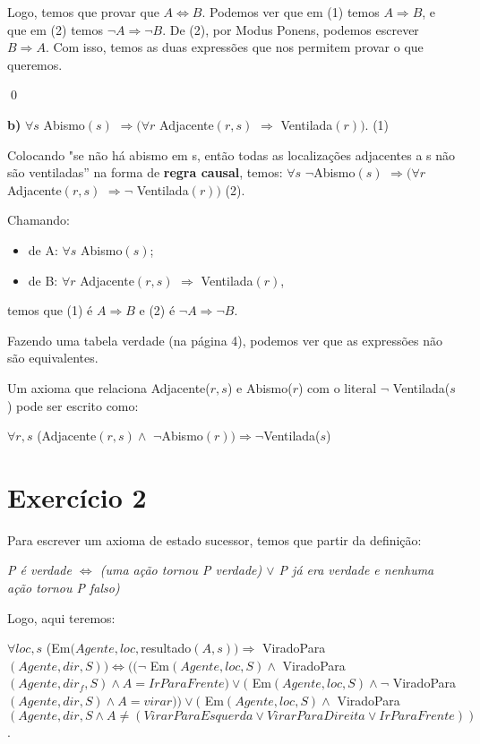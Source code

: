 \documentclass[12pt,letterpaper]{article}
\begin{document}
	Logo, temos que provar que $A \Leftrightarrow B$. Podemos ver que em (1) temos $A \Rightarrow B$, e que em (2) temos $\lnot A \Rightarrow \lnot B$. De (2), por Modus Ponens, podemos escrever $B \Rightarrow A$. Com isso, temos as duas expressões que nos permitem provar o que queremos. 
	
	\qed
	
	\textbf{b)} $\forall s$ Abismo$(s)$ $\Rightarrow (\forall r$ Adjacente$(r, s)$ $\Rightarrow$ Ventilada$(r))$. (1)
	
	Colocando "se não há abismo em s, então todas as localizações adjacentes a s não são ventiladas” na forma de \textbf{regra causal}, temos: $\forall s$ $\lnot$Abismo$(s)$ $\Rightarrow (\forall r$ Adjacente$(r, s)$ $\Rightarrow \lnot$ Ventilada$(r))$ (2).
	
	Chamando: 
	\begin{itemize}
		\item de A: $\forall s$ Abismo$(s)$;
		\item de B: $\forall r$ Adjacente$(r, s)$ $\Rightarrow$ Ventilada$(r)$,
	\end{itemize}
	
	temos que (1) é $A \Rightarrow B$ e (2) é $\lnot A \Rightarrow \lnot B$.
	
	Fazendo uma tabela verdade (na página 4), podemos ver que as expressões não são equivalentes.
	
	Um axioma que relaciona Adjacente($r,s$) e Abismo($r$) com o literal $\lnot$ Ventilada($s$) pode ser escrito como:
	
	\begin{center}
		$\forall r, s$ (Adjacente$(r,s) \land$ $\lnot$Abismo$(r)) \Rightarrow \lnot$Ventilada($s$)
	\end{center}
	
	\section*{Exercício 2}
	
	Para escrever um axioma de estado sucessor, temos que partir da definição:
	
	\begin{center}
		\textit{P é verdade $\Leftrightarrow$ (uma ação tornou P verdade) $\lor$ P já era
		verdade e nenhuma ação tornou P falso)} 
	\end{center}
	
	Logo, aqui teremos: 
	
	$\forall loc, s$ (Em$(Agente, loc, $resultado$(A, s)) \Rightarrow$ ViradoPara$(Agente, dir, S)) \Leftrightarrow ((\lnot$ Em$(Agente, loc, S) \land$ ViradoPara$(Agente, dir_f, S) \land A = IrParaFrente) \lor ($ Em$(Agente, loc, S) \land \lnot$ ViradoPara$(Agente, dir, S) \land A = virar)) \lor ($ Em$(Agente, loc, S) \land $ ViradoPara$(Agente, dir, S \land A \neq (VirarParaEsquerda \lor VirarParaDireita \lor IrParaFrente))$.
	
\end{document}
